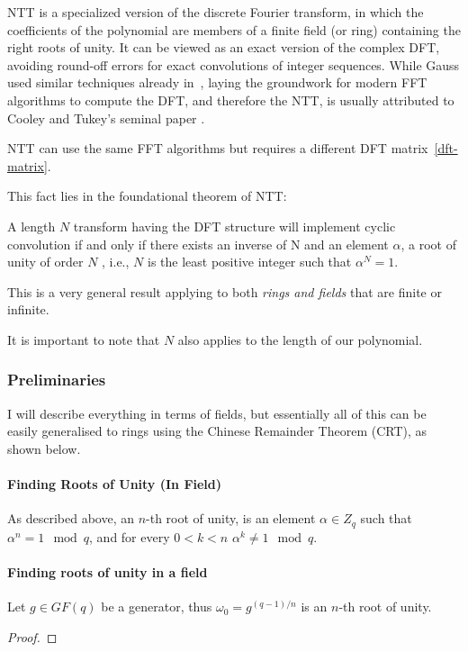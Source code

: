 NTT is a specialized version of the discrete Fourier transform,
in which the coefficients of the polynomial are members of a finite field (or ring)
 containing the right roots of unity.
It can be viewed as an exact version of the complex DFT, avoiding 
round-off errors for exact convolutions of integer sequences.
While Gauss used similar techniques already in~\cite{gaussfft}, laying the groundwork 
for modern FFT algorithms to compute the DFT, and therefore the NTT, 
is usually attributed to Cooley and Tukey's seminal paper \cite{fft}.

NTT can use the same FFT algorithms but requires a 
different DFT matrix~\ref{dft-matrix}.

This fact lies in the foundational theorem of NTT:
\begin{theorem}
  A length $N$ transform having the DFT structure will
  implement cyclic convolution if and only if there exists an 
  inverse of N and an element $\alpha$,
  a root of unity of order $N$ , i.e., $N$ is the least 
  positive integer such that $\alpha^N =1$.
\end{theorem}
This is a very general result applying to both \emph{rings and fields} that are
finite or infinite.

It is important to note that $N$ also applies to the length of our polynomial.

\subsubsection{Preliminaries}
I will describe everything in terms of fields, but essentially all of this can be easily generalised to rings 
using the Chinese Remainder Theorem (CRT), as shown below.
\paragraph{\bf Finding Roots of Unity (In Field)}
As described above, an $n$-th root of unity, is an element $\alpha\in Z_q$ 
such that $\alpha^n =1  \mod q $, and for every $0<k<n$ $\alpha^k \neq 1 \mod q$.

\paragraph{Finding roots of unity in a field}

\begin{theorem}
  Let $g\in GF(q)$ be a generator, thus
  $\omega_0=g^{(q-1)/n}$ is an $n$-th root of unity.
\end{theorem}
\begin{proof}
\end{proof}

